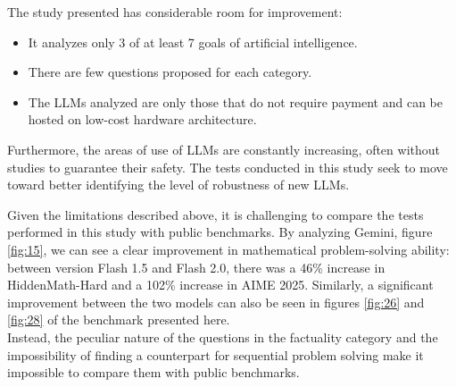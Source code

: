 \documentclass[12pt]{article}
\begin{document}
The study presented has considerable room for improvement: 
\begin{itemize}
\item It analyzes only 3 of at least 7 goals of artificial intelligence.
\item There are few questions proposed for each category.
\item The LLMs analyzed are only those that do not require payment and can be hosted on low-cost hardware architecture.
\end{itemize}
Furthermore, the areas of use of LLMs are constantly increasing, often without studies to guarantee their safety. The tests conducted in this study seek to move toward better identifying the level of robustness of new LLMs.

Given the limitations described above, it is challenging to compare the tests performed in this study with public benchmarks. 
By analyzing Gemini, figure \ref{fig:15}, we can see a clear improvement in mathematical problem-solving ability: between version Flash 1.5 and Flash 2.0, there was a 46\% increase in HiddenMath-Hard and a 102\% increase in AIME 2025. Similarly, a significant improvement between the two models can also be seen in figures \ref{fig:26} and \ref{fig:28} of the benchmark presented here.\\
Instead, the peculiar nature of the questions in the factuality category and the impossibility of finding a counterpart for sequential problem solving make it impossible to compare them with public benchmarks.


\clearpage
\printbibliography
\clearpage
\end{document}
